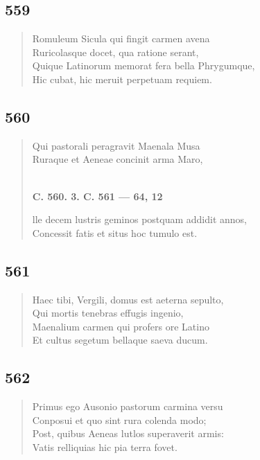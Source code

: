 \documentclass[11pt, a4paper]{report}
\begin{document}
            \subsection*{559}
      \begin{verse}
      Romuleum Sicula qui fingit carmen avena \\ Ruricolasque docet, qua ratione serant, \\ Quique Latinorum memorat fera bella Phrygumque, \\ Hic cubat, hic meruit perpetuam requiem. \\ 
      \end{verse}
  
            \subsection*{560}
      \begin{verse}
      Qui pastorali peragravit Maenala Musa \\ Ruraque et Aeneae concinit arma Maro, \\ 
        ﻿\pagebreak 
    \begin{center} \textbf{C. 560. 3. C. 561 — 64, 12} \end{center} \marginpar{[74]} lle decem lustris geminos postquam addidit annos, \\ Concessit fatis et situs hoc tumulo est. \\ 
      \end{verse}
  
            \subsection*{561}
      \begin{verse}
      Haec tibi, Vergili, domus est aeterna sepulto, \\ Qui mortis tenebras effugis ingenio, \\ Maenalium carmen qui profers ore Latino \\ Et cultus segetum bellaque saeva ducum. \\ 
      \end{verse}
  
            \subsection*{562}
      \begin{verse}
      Primus ego Ausonio pastorum carmina versu \\ Conposui et quo sint rura colenda modo; \\ Post, quibus Aeneas lutlos superaverit armis: \\ Vatis relliquias hic pia terra fovet. \\ 
      \end{verse}
  
\end{document}
